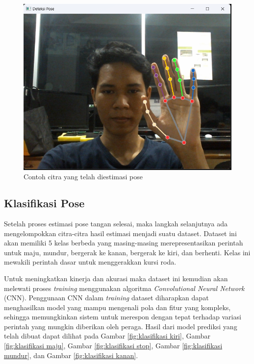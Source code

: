 \begin{figure} [ht] \centering
  \includegraphics[scale=0.5]{gambar/bab3/EstimasiPose.png}
  \caption{Contoh citra yang telah diestimasi pose}
  \label{fig:contoh citra yang telah diestimasi pose}
\end{figure}

\newpage

\subsection{Klasifikasi Pose}
Setelah proses estimasi pose tangan selesai, maka langkah selanjutnya ada mengelompokkan citra-citra hasil estimasi menjadi suatu dataset. Dataset ini akan memiliki 5 kelas berbeda yang masing-masing merepresentasikan perintah untuk maju, mundur, bergerak ke kanan, bergerak ke kiri, dan berhenti. Kelas ini mewakili perintah dasar untuk menggerakkan kursi roda. 

Untuk meningkatkan kinerja dan akurasi maka dataset ini kemudian akan melewati proses \emph{training} menggunakan algoritma \emph{Convolutional Neural Network} (CNN). Penggunaan CNN dalam \emph{training} dataset diharapkan dapat menghasilkan model yang mampu mengenali pola dan fitur yang kompleks, sehingga memungkinkan sistem untuk merespon dengan tepat terhadap variasi perintah yang mungkin diberikan oleh peraga. Hasil dari model prediksi yang telah dibuat dapat dilihat pada Gambar \ref{fig:klasifikasi kiri}, Gambar \ref{fig:klasifikasi maju}, Gambar \ref{fig:klasifikasi stop}, Gambar \ref{fig:klasifikasi mundur}, dan Gambar \ref{fig:klasifikasi kanan}.

